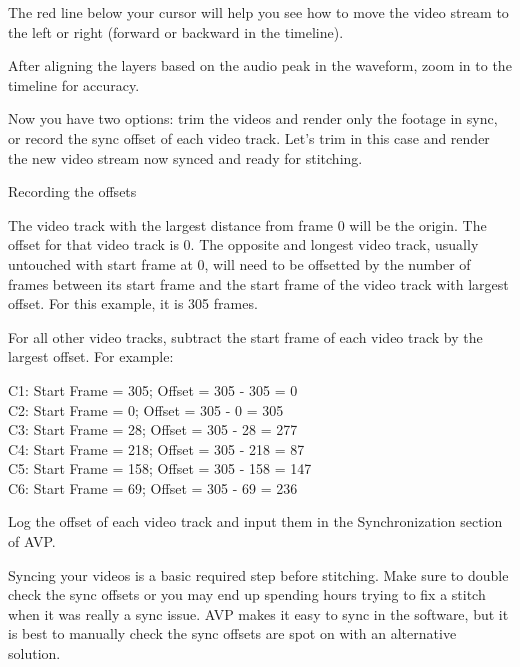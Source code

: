 \begin{fullwidth}

The red line below your cursor will help you see how to move the video stream to the left or right (forward or backward in the timeline). 

After aligning the layers based on the audio peak in the waveform, zoom in to the timeline for accuracy.


Now you have two options: trim the videos and render only the footage in sync, or record the sync offset of each video track. Let’s trim in this case and render the new video stream now synced and ready for stitching.


\clearpage
{\large Recording the offsets \par}

The video track with the largest distance from frame 0 will be the origin. The offset for that video track is 0. The opposite and longest video track, usually untouched with start frame at 0, will need to be offsetted by the number of frames between its start frame and the start frame of the video track with largest offset. For this example, it is 305 frames.


For all other video tracks, subtract the start frame of each video track by the largest offset. For example: 

C1: Start Frame = 305; Offset = 305 - 305 = 0
\\
C2: Start Frame = 0; Offset = 305 - 0 = 305
\\
C3: Start Frame = 28; Offset = 305 - 28 = 277
\\
C4: Start Frame = 218; Offset = 305 - 218 = 87
\\
C5: Start Frame = 158; Offset = 305 - 158 = 147
\\
C6: Start Frame = 69; Offset = 305 - 69 = 236

Log the offset of each video track and input them in the Synchronization section of AVP.

Syncing your videos is a basic required step before stitching. Make sure to double check the sync offsets or you may end up spending hours trying to fix a stitch when it was really a sync issue. AVP makes it easy to sync in the software, but it is best to manually check the sync offsets are spot on with an alternative solution.


\clearpage
\end{fullwidth}